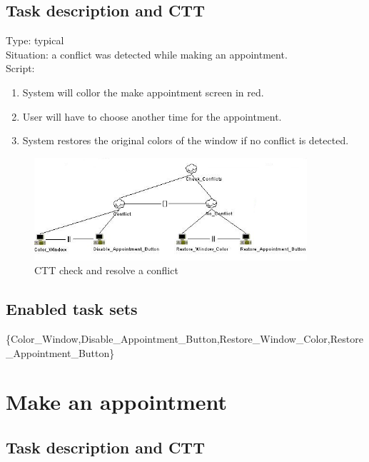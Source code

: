 \documentclass[11pt, a4paper,svglistings]{report}
\begin{document}
\subsection{Task description and CTT}

\label{subsec:conflict}Type: typical \\
Situation: a conflict was detected while making an appointment. \\
Script:
\begin{enumerate}
\item System will collor the make appointment screen in red.
\item User will have to choose another time for the appointment.
\item System restores the original colors of the window if no conflict is detected.
\end{enumerate}

\begin{figure}[H]
\centering
    \includegraphics[width=0.9\textwidth]{CheckConflicts.png}
  \caption[Check conflict CTT]{\label{fig:CheckConflict}CTT check and resolve a conflict}
\end{figure}

\subsection{Enabled task sets}

\{Color\_Window,Disable\_Appointment\_Button,Restore\_Window\_Color,Restore\_Appointment\_Button\}


\section{Make an appointment}

\subsection{Task description and CTT}
\end{document}
